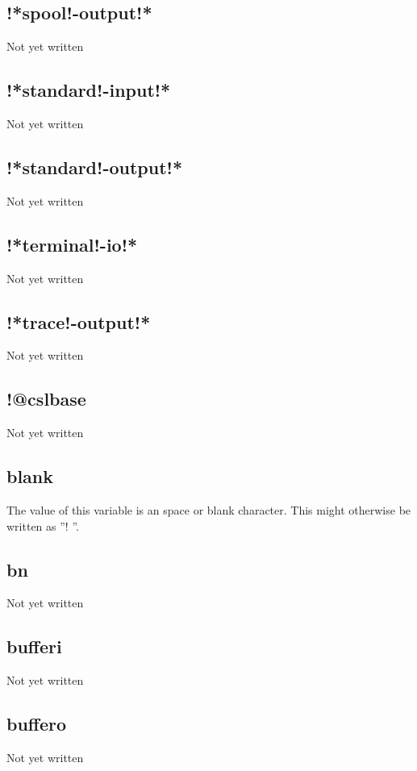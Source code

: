 \documentclass[a4paper,11pt]{article}
\begin{document}
\subsection{\ttfamily !*spool!-output!*}
Not yet written

\subsection{\ttfamily !*standard!-input!*}
Not yet written

\subsection{\ttfamily !*standard!-output!*}
Not yet written

\subsection{\ttfamily !*terminal!-io!*}
Not yet written

\subsection{\ttfamily !*trace!-output!*}
Not yet written

\subsection{\ttfamily !@cslbase}
Not yet written

\subsection{\ttfamily blank}
The value of this variable is an space or blank character. This
might otherwise be written as ''{\ttfamily ! }''.

\subsection{\ttfamily bn}
Not yet written

\subsection{\ttfamily bufferi}
Not yet written

\subsection{\ttfamily buffero}
Not yet written
\end{document}
